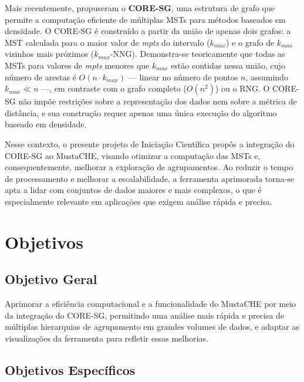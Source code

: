 \documentclass[12pt,a4paper,oneside]{article}
\begin{document}
Mais recentemente, \textcite{naldi2022coresg} propuseram o \textbf{CORE-SG}, uma estrutura
de grafo que permite a computação eficiente de múltiplas MSTs para métodos baseados em
densidade. O CORE-SG é construído a partir da união de apenas dois grafos: a MST calculada
para o maior valor de \textit{mpts} do intervalo ($k_{max}$) e o grafo de $k_{max}$ vizinhos
mais próximos ($k_{max}$-NNG). Demonstra-se teoricamente que todas as MSTs para valores de
\textit{mpts} menores que $k_{max}$ estão contidas nessa união, cujo número de arestas é
$O(n \cdot k_{max})$ --- linear no número de pontos $n$, assumindo $k_{max} \ll n$ ---, em
contraste com o grafo completo ($O(n^2)$) ou o RNG. O CORE-SG não impõe restrições sobre a
representação dos dados nem sobre a métrica de distância, e sua construção requer apenas uma
única execução do algoritmo baseado em densidade.

Nesse contexto, o presente projeto de Iniciação Científica propôs a integração do CORE-SG ao
MustaCHE, visando otimizar a computação das MSTs e, consequentemente, melhorar a exploração de
agrupamentos. Ao reduzir o tempo de processamento e melhorar a escalabilidade, a ferramenta
aprimorada torna-se apta a lidar com conjuntos de dados maiores e mais complexos, o que é
especialmente relevante em aplicações que exigem análise rápida e precisa.

\section{Objetivos}

\subsection{Objetivo Geral}

Aprimorar a eficiência computacional e a funcionalidade do MustaCHE por meio da integração do
CORE-SG, permitindo uma análise mais rápida e precisa de múltiplas hierarquias de agrupamento
em grandes volumes de dados, e adaptar as visualizações da ferramenta para refletir essas
melhorias.

\subsection{Objetivos Específicos}
\end{document}
